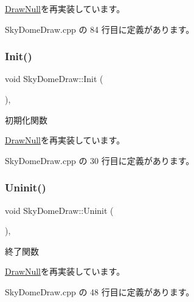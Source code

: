 \mbox{\hyperlink{class_draw_null_a9aac059eb3b5d1f77e8bd3aa0647cff9}{Draw\+Null}}を再実装しています。



 Sky\+Dome\+Draw.\+cpp の 84 行目に定義があります。

\mbox{\label{class_sky_dome_draw_a5b82e8b650a20dbc0b7ed720d1fb7fab}} 
\subsubsection{\texorpdfstring{Init()}{Init()}}
{\footnotesize\ttfamily void Sky\+Dome\+Draw\+::\+Init (\begin{DoxyParamCaption}{ }\end{DoxyParamCaption})\hspace{0.3cm}{\ttfamily [override]}, {\ttfamily [virtual]}}



初期化関数 



\mbox{\hyperlink{class_draw_null_a20aef1e54c1a158b741bfd731e18efdf}{Draw\+Null}}を再実装しています。



 Sky\+Dome\+Draw.\+cpp の 30 行目に定義があります。

\mbox{\label{class_sky_dome_draw_aee1c6b102a97033073b2559b8c2c328b}} 
\subsubsection{\texorpdfstring{Uninit()}{Uninit()}}
{\footnotesize\ttfamily void Sky\+Dome\+Draw\+::\+Uninit (\begin{DoxyParamCaption}{ }\end{DoxyParamCaption})\hspace{0.3cm}{\ttfamily [override]}, {\ttfamily [virtual]}}



終了関数 



\mbox{\hyperlink{class_draw_null_a6e81d63efab7333e8d0e8af99362a4d9}{Draw\+Null}}を再実装しています。



 Sky\+Dome\+Draw.\+cpp の 48 行目に定義があります。



